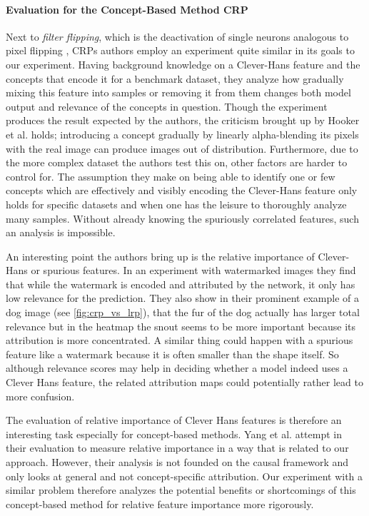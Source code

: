 \paragraph{Evaluation for the Concept-Based Method CRP}
Next to \textit{filter flipping}, which is the deactivation of single neurons analogous to pixel flipping \cite{Samek2017a}, CRPs authors employ an experiment quite similar in its goals to our experiment. 
Having background knowledge on a Clever-Hans feature and the concepts that encode it for a benchmark dataset, they analyze how gradually mixing this feature into samples or removing it from them changes both model output and relevance of the concepts in question. 
Though the experiment produces the result expected by the authors, the criticism brought up by Hooker et al. \cite{Hooker2019} holds; introducing a concept gradually by linearly alpha-blending its pixels with the real image can produce images out of distribution. Furthermore, due to the more complex dataset the authors test this on, other factors are harder to control for. The assumption they make on being able to identify one or few concepts which are effectively and visibly encoding the Clever-Hans feature only holds for specific datasets and when one has the leisure to thoroughly analyze many samples. Without already knowing the spuriously correlated features, such an analysis is impossible. 

An interesting point the authors bring up is the relative importance of Clever-Hans or spurious features. In an experiment with watermarked images they find that while the watermark is encoded and attributed by the network, it only has low relevance for the prediction. They also show in their prominent example of a dog image (see \cref{fig:crp_vs_lrp}), that the fur of the dog actually has larger total relevance but in the heatmap the snout seems to be more important because its attribution is more concentrated. A similar thing could happen with a spurious feature like a watermark because it is often smaller than the shape itself. So although relevance scores may help in deciding whether a model indeed uses a Clever Hans feature, the related attribution maps could potentially rather lead to more confusion.

The evaluation of relative importance of Clever Hans features is therefore an interesting task especially for concept-based methods. 
Yang et al. \cite{Yang2019} attempt in their evaluation to measure relative importance in a way that is related to our approach. However, their analysis is not founded on the causal framework and only looks at general and not concept-specific attribution. 
Our experiment with a similar problem therefore analyzes the potential benefits or shortcomings of this concept-based method for relative feature importance more rigorously. 

